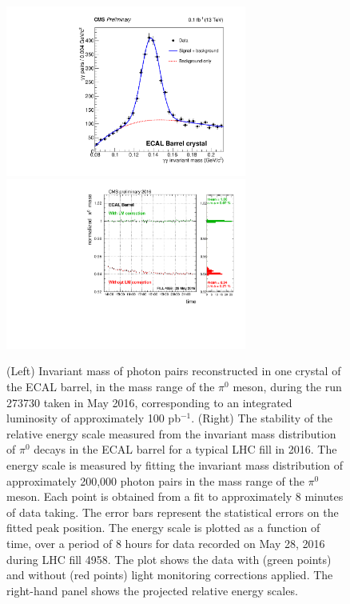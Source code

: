 \begin{figure}[bht]
\begin{center}
\includegraphics[height=5.6cm]{figs/cms/Fit_EB_cry.pdf}
\includegraphics[height=5.6cm]{figs/cms/pi0_EB_plus_1.pdf}
\end{center}
\caption{\label{fig:etaEB}
 (Left) Invariant mass of photon
pairs reconstructed in one crystal of the ECAL barrel, in
the mass range of the $\pi^0$ meson, during the run 273730 taken in May 2016,
corresponding to an integrated luminosity of approximately 100
pb$^{-1}$. (Right) The stability of the relative energy scale measured from the invariant mass distribution of
$\pi^0$ decays in the ECAL barrel for a typical LHC fill in 2016. The energy scale is measured by fitting
the invariant mass distribution of approximately 200,000 photon pairs
in the mass range of the $\pi^0$ meson. Each point is obtained from a fit
to approximately 8 minutes of data taking. The error bars represent
the statistical errors on the fitted peak position. The energy scale
is plotted as a function of time, over a period of 8 hours for data recorded on May 28, 2016 during LHC fill 4958. The
plot shows the data with (green points) and without (red points) light
monitoring corrections applied. The right-hand panel shows the
projected relative energy scales.
}
\end{figure}

